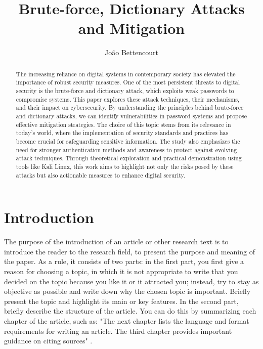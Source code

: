 \documentclass{comjnl}
\begin{document}
\author{João Bettencourt}
\title{Brute-force, Dictionary Attacks and Mitigation}
 

 



\begin{abstract}
The increasing reliance on digital systems in contemporary society has elevated the importance of robust security measures. One of the most persistent threats to digital security is the brute-force and dictionary attack, which exploits weak passwords to compromise systems. This paper explores these attack techniques, their mechanisms, and their impact on cybersecurity. By understanding the principles behind brute-force and dictionary attacks, we can identify vulnerabilities in password systems and propose effective mitigation strategies. The choice of this topic stems from its relevance in today's world, where the implementation of security standards and practices has become crucial for safeguarding sensitive information. The study also emphasizes the need for stronger authentication methods and awareness to protect against evolving attack techniques. Through theoretical exploration and practical demonstration using tools like Kali Linux, this work aims to highlight not only the risks posed by these attacks but also actionable measures to enhance digital security.
\end{abstract}

\maketitle


\section{Introduction}
\label{Sec:Sklicnapoglavje}
The purpose of the introduction of an article or other research text is to introduce the reader to the research field, to present the purpose and meaning of the paper. As a rule, it consists of two parts: in the first part, you first give a reason for choosing a topic, in which it is not appropriate to write that you decided on the topic because you like it or it attracted you; instead, try to stay as objective as possible and write down why the chosen topic is important. Briefly present the topic and highlight its main or key features. In the second part, briefly describe the structure of the article. You can do this by summarizing each chapter of the article, such as: "The next chapter lists the language and format requirements for writing an article. The third chapter provides important guidance on citing sources" \cite{VomBrocke2015}.
\end{document}
